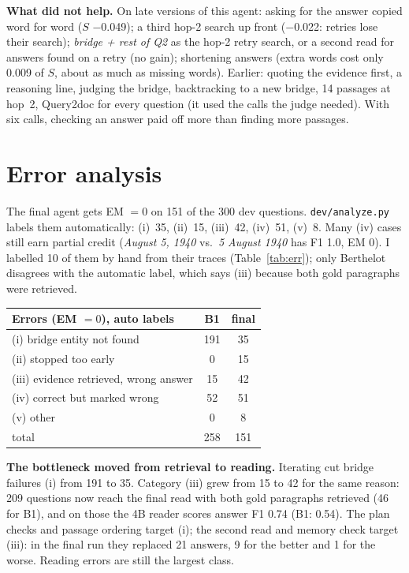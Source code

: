 \documentclass[10pt,a4paper]{article}
\begin{document}
\textbf{What did not help.} On late versions of this agent: asking for the answer copied word for word
($S$ $-$0.049); a third hop-2 search up front ($-$0.022: retries lose their search); \emph{bridge + rest of Q2} as
the hop-2 retry search, or a second read for answers found on a retry (no gain); shortening answers (extra words cost
only 0.009 of $S$, about as much as missing words). Earlier: quoting the evidence first, a reasoning line, judging
the bridge, backtracking to a new bridge, 14 passages at hop~2, Query2doc for every question (it used the calls the
judge needed). With six calls, checking an answer paid off more than finding more passages.


\section{Error analysis}
The final agent gets EM $=0$ on 151 of the 300 dev questions. \texttt{dev/analyze.py} labels them automatically:
(i)~35, (ii)~15, (iii)~42, (iv)~51, (v)~8. Many (iv) cases still earn partial credit (\emph{August 5, 1940} vs.\
\emph{5 August 1940} has F1 1.0, EM 0). I labelled 10 of them by hand from their traces (Table~\ref{tab:err}); only
Berthelot disagrees with the automatic label, which says (iii) because both gold paragraphs were retrieved.

\begin{minipage}[t]{0.47\textwidth}
\vspace{0pt}
\centering\footnotesize
\begin{tabular}{@{}lcc@{}}
\toprule
Errors (EM $=0$), auto labels & B1 & final\\
\midrule
(i) bridge entity not found & 191 & 35\\
(ii) stopped too early & 0 & 15\\
(iii) evidence retrieved, wrong answer & 15 & 42\\
(iv) correct but marked wrong & 52 & 51\\
(v) other & 0 & 8\\
\midrule
total & 258 & 151\\
\bottomrule
\end{tabular}
\label{tab:cats}
\end{minipage}\hfill
\begin{minipage}[t]{0.505\textwidth}
\vspace{0pt}
\textbf{The bottleneck moved from retrieval to reading.} Iterating cut bridge failures (i) from 191 to 35.
Category (iii) grew from 15 to 42 for the same reason: 209 questions now reach the final read with both gold
paragraphs retrieved (46 for B1), and on those the 4B reader scores answer F1 0.74 (B1: 0.54). The plan checks
and passage ordering target (i); the second read and memory check target (iii): in the final run they replaced
21 answers, 9 for the better and 1 for the worse. Reading errors are still the largest class.
\end{minipage}
\end{document}
